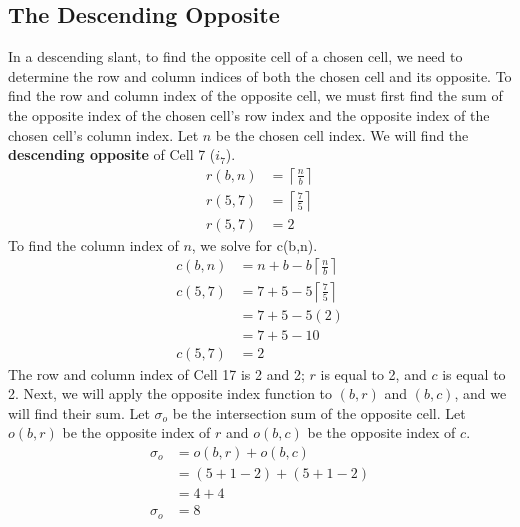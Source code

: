 \documentclass[letterpaper, twoside,12pt]{article}
\begin{document}
    \subsection{The Descending Opposite}
    In a descending slant, to find the opposite cell of a chosen cell, we need to determine the row and column indices of both the chosen cell and its opposite. To find the row and column index of the opposite cell, we must first find the sum of the opposite index of the chosen cell's row index and the opposite index of the chosen cell's column index. Let $n$ be the chosen cell index. We will find the \textbf{descending opposite} of Cell 7 ($i_{7}$).
    \begin{equation}
        \begin{split}
            r(b,n) &= \left\lceil \frac{n}{b}\right\rceil \\
            r(5,7) &= \left\lceil \frac{7}{5}\right\rceil \\
            r(5,7) &= 2
        \end{split}
    \end{equation}
    To find the column index of $n$, we solve for c(b,n).
    \begin{equation}
        \begin{split}
            c(b,n) &= n + b - b\left\lceil \frac{n}{b}\right\rceil \\
            c(5,7) &= 7 + 5 - 5\left\lceil \frac{7}{5}\right\rceil \\
                &= 7 + 5 - 5(2) \\
                &= 7 + 5 - 10 \\
            c(5,7) &= 2
        \end{split}
    \end{equation}
    The row and column index of Cell 17 is 2 and 2; $r$ is equal to 2, and $c$ is equal to 2. Next, we will apply the opposite index function to $(b,r)$ and $(b,c)$, and we will find their sum. Let $\sigma_o$ be the intersection sum of the opposite cell. Let $o(b,r)$ be the opposite index of $r$ and $o(b,c)$ be the opposite index of $c$.
    \begin{equation}
        \begin{split}
            \sigma_o &= o(b,r) + o(b,c) \\
                &= (5 + 1 - 2) + (5 + 1 - 2) \\
                &= 4 + 4 \\
            \sigma_o &= 8 \\
        \end{split}
    \end{equation}
\end{document}
